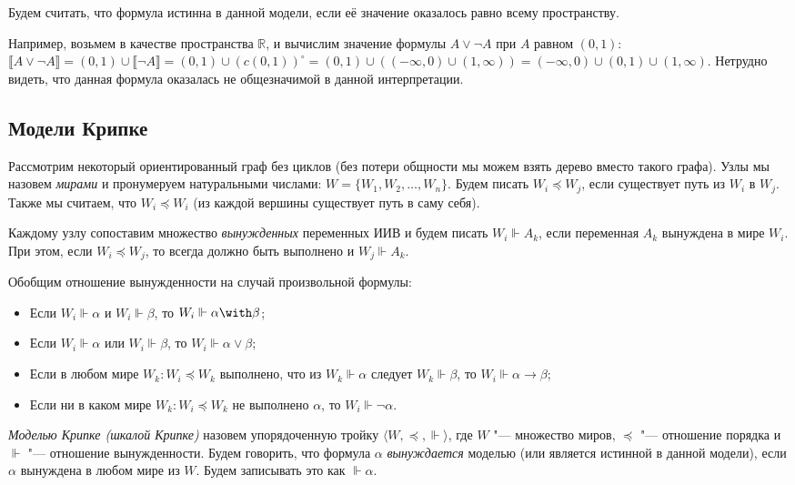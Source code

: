 Будем считать, что формула истинна в данной модели, если её значение оказалось равно
всему пространству. 

Например, возьмем в качестве пространства $\mathbb{R}$, и вычислим значение формулы $A \vee \neg A$ 
при $A$ равном $(0,1)$: $\llbracket A \vee \neg A \rrbracket = (0,1) \cup \llbracket \neg A \rrbracket = 
(0,1) \cup (c(0,1))^\circ = (0,1) \cup ((-\infty,0)\cup(1,\infty)) = (-\infty,0)\cup(0,1)\cup(1,\infty)$.
Нетрудно видеть, что данная формула оказалась не общезначимой в данной интерпретации.

\subsection{Модели Крипке}

\begin{definition}
Рассмотрим некоторый ориентированный граф без циклов (без потери общности мы можем взять дерево вместо такого графа). 
Узлы мы назовем \emph{мирами} и пронумеруем натуральными числами: $W = \{ W_1, W_2, \dots, W_n\}$. 
Будем писать $W_i \preceq W_j$, если существует путь из $W_i$ в $W_j$.
Также мы считаем, что $W_i \preceq W_i$ (из каждой вершины существует путь в саму себя).
\end{definition}

\begin{definition}
Каждому узлу сопоставим множество \emph{вынужденных} переменных ИИВ и будем писать $W_i \Vdash A_k$, 
если переменная $A_k$ вынуждена в мире $W_i$. При этом, если $W_i \preceq W_j$, 
то всегда должно быть выполнено и $W_j \Vdash A_k$.
\end{definition}

Обобщим отношение вынужденности на случай произвольной формулы:
\begin{itemize}
\item Если $W_i \Vdash \alpha$ и $W_i \Vdash \beta$, то $W_i \Vdash \alpha\with\beta$;
\item Если $W_i \Vdash \alpha$ или $W_i \Vdash \beta$, то $W_i \Vdash \alpha\vee\beta$;
\item Если в любом мире $W_k: W_i \preceq W_k$ выполнено, что из $W_k \Vdash \alpha$ следует $W_k \Vdash \beta$, 
то $W_i \Vdash \alpha\rightarrow\beta$;
\item Если ни в каком мире $W_k: W_i \preceq W_k$ не выполнено $\alpha$, то $W_i \Vdash \neg\alpha$.
\end{itemize}

\begin{definition}
\emph{Моделью Крипке (шкалой Крипке)} назовем  упорядоченную тройку $\langle W, \preceq, \Vdash \rangle$, где $W$ "--- множество миров, $\preceq$ "--- отношение порядка и $\Vdash$ "--- отношение вынужденности.
Будем говорить, что формула $\alpha$ \emph{вынуждается} моделью (или является истинной в данной модели), если  $\alpha$ вынуждена в любом мире из $W$. Будем записывать это как $\Vdash \alpha$.
\end{definition}

